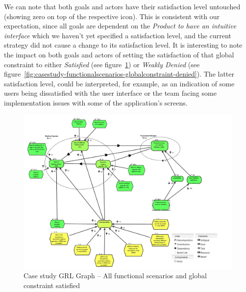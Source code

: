 \documentclass[dissertation,final]{softeng}
\begin{document}
We can note that both goals and actors have their satisfaction level untouched (showing zero on top of the respective icon). This is consistent with our expectation, since all goals are dependent on the \emph{Product to have an intuitive interface} which we haven't yet specified a satisfaction level, and the current strategy did not cause a change to its satisfaction level. It is interesting to note the impact on both goals and actors of setting the satisfaction of that global constraint to either \emph{Satisfied} (see figure~\ref{fig:casestudy-functionalscenarios-globalconstraint}) or \emph{Weakly Denied} (see figure~\ref{fig:casestudy-functionalscenarios-globalconstraint-denied}). The latter satisfaction level, could be interpreted, for example, as an indication of some users being dissatisfied with the user interface or the team facing some implementation issues with some of the application's screens.

\begin{figure}
\includegraphics[width=\columnwidth]{casestudy-functionalscenarios-globalconstraint}
\centering
\caption{Case study GRL Graph -- All functional scenarios and global constraint satisfied}
\label{fig:casestudy-functionalscenarios-globalconstraint}
\end{figure} 
\end{document}
